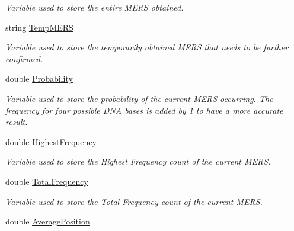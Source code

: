 \begin{DoxyCompactItemize}
\begin{DoxyCompactList}\small\item\em Variable used to store the entire M\+E\+R\+S obtained. \end{DoxyCompactList}\item 
\hypertarget{class_calculation_a9b53fe53209e035aeb3e9aa05b138abf}{string \hyperlink{class_calculation_a9b53fe53209e035aeb3e9aa05b138abf}{Temp\+M\+E\+R\+S}}\label{class_calculation_a9b53fe53209e035aeb3e9aa05b138abf}

\begin{DoxyCompactList}\small\item\em Variable used to store the temporarily obtained M\+E\+R\+S that needs to be further confirmed. \end{DoxyCompactList}\item 
\hypertarget{class_calculation_a5faa2d2f3373796f051223c11efe9473}{double \hyperlink{class_calculation_a5faa2d2f3373796f051223c11efe9473}{Probability}}\label{class_calculation_a5faa2d2f3373796f051223c11efe9473}

\begin{DoxyCompactList}\small\item\em Variable used to store the probability of the current M\+E\+R\+S occurring. The frequency for four possible D\+N\+A bases is added by 1 to have a more accurate result. \end{DoxyCompactList}\item 
\hypertarget{class_calculation_a23bf91c51fd0e2490264c59645ade570}{double \hyperlink{class_calculation_a23bf91c51fd0e2490264c59645ade570}{Highest\+Frequency}}\label{class_calculation_a23bf91c51fd0e2490264c59645ade570}

\begin{DoxyCompactList}\small\item\em Variable used to store the Highest Frequency count of the current M\+E\+R\+S. \end{DoxyCompactList}\item 
\hypertarget{class_calculation_a67c8ff4d4cd268f2f84edbe7cf807abd}{double \hyperlink{class_calculation_a67c8ff4d4cd268f2f84edbe7cf807abd}{Total\+Frequency}}\label{class_calculation_a67c8ff4d4cd268f2f84edbe7cf807abd}

\begin{DoxyCompactList}\small\item\em Variable used to store the Total Frequency count of the current M\+E\+R\+S. \end{DoxyCompactList}\item 
\hypertarget{class_calculation_aa00f7d8f605cf0209fed4e5fd37945ee}{double \hyperlink{class_calculation_aa00f7d8f605cf0209fed4e5fd37945ee}{Average\+Position}}\label{class_calculation_aa00f7d8f605cf0209fed4e5fd37945ee}


\end{DoxyCompactItemize}
